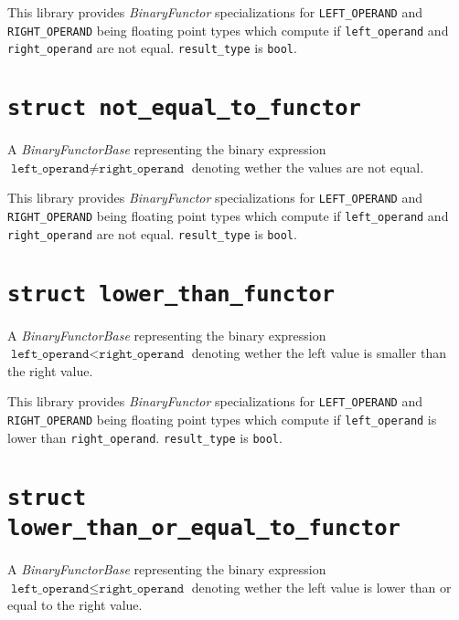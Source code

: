 \documentclass[oneside]{book}
\begin{document}
\noindent{}This library provides \textit{BinaryFunctor}         specializations for
\texttt{LEFT\_OPERAND} and   \texttt{RIGHT\_OPERAND} being     floating point types
which compute if \texttt{left\_operand} and \texttt{right\_operand} are not  equal.
\texttt{result\_type} is \texttt{bool}.

\section{\texttt{struct not\_equal\_to\_functor}}
A \textit{BinaryFunctorBase} representing the binary expression
$\texttt{left\_operand} \neq \texttt{right\_operand}$
denoting wether the values are not equal.\newline

\noindent{}This library provides \textit{BinaryFunctor}         specializations for
\texttt{LEFT\_OPERAND} and   \texttt{RIGHT\_OPERAND} being     floating point types
which compute if \texttt{left\_operand} and \texttt{right\_operand} are not  equal.
\texttt{result\_type} is \texttt{bool}.

\section{\texttt{struct lower\_than\_functor}}
A \textit{BinaryFunctorBase} representing the binary expression
$\texttt{left\_operand} < \texttt{right\_operand}$
denoting wether the left value is smaller than the right value.\newline

\noindent{}This library provides \textit{BinaryFunctor}         specializations for
\texttt{LEFT\_OPERAND} and   \texttt{RIGHT\_OPERAND} being     floating point types
which compute if \texttt{left\_operand}      is lower than \texttt{right\_operand}.
\texttt{result\_type} is \texttt{bool}.

\section{\texttt{struct lower\_than\_or\_equal\_to\_functor}}
A \textit{BinaryFunctorBase} representing the binary expression
$\texttt{left\_operand} \leq \texttt{right\_operand}$
denoting wether the left value is lower than or equal to the right value.\newline
\end{document}
